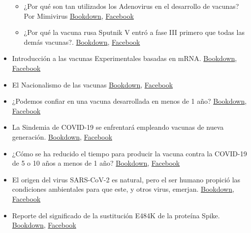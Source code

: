 \documentclass[
  12pt, krantz2,
  spanish,
]{krantz}
\begin{document}
\begin{itemize}
  \begin{itemize}
  \item
    ¿Por qué son tan utilizados los Adenovirus en el desarrollo de vacunas? Por Mimivirus \href{}{Bookdown}, \href{https://www.facebook.com/permalink.php?story_fbid=194256785632477\&id=107088044349352}{Facebook}
  \item
    ¿Por qué la vacuna rusa Sputnik V entró a fase III primero que todas las demás vacunas?. \href{}{Bookdown}, \href{https://www.facebook.com/permalink.php?story_fbid=194473115610844\&id=107088044349352}{Facebook}
  \end{itemize}
\item
  Introducción a las vacunas Experimentales basadas en mRNA. \href{}{Bookdown}, \href{https://www.facebook.com/permalink.php?story_fbid=195407762184046\&id=107088044349352}{Facebook}
\item
  El Nacionalismo de las vacunas \href{}{Bookdown}, \href{https://www.facebook.com/permalink.php?story_fbid=195747918816697\&id=107088044349352}{Facebook}
\item
  ¿Podemos confiar en una vacuna desarrollada en menos de 1 año? \href{}{Bookdown}, \href{https://www.facebook.com/permalink.php?story_fbid=210814357310053\&id=107088044349352}{Facebook}
\item
  La Sindemia de COVID-19 se enfrentará empleando vacunas de nueva generación. \href{}{Bookdown}, \href{https://www.facebook.com/permalink.php?story_fbid=211176330607189\&id=107088044349352}{Facebook}
\item
  ¿Cómo se ha reducido el tiempo para producir la vacuna contra la COVID-19 de 5 o 10 años a menos de 1 año? \href{}{Bookdown}, \href{https://www.facebook.com/BioViral/videos/437319657293716/}{Facebook}
\item
  El origen del virus SARS-CoV-2 es natural, pero el ser humano propició las condiciones ambientales para que este, y otros virus, emerjan. \href{}{Bookdown}, \href{https://www.facebook.com/permalink.php?story_fbid=215833596808129\&id=107088044349352}{Facebook}
\item
  Reporte del significado de la sustitución E484K de la proteína Spike. \href{}{Bookdown}, \href{https://www.facebook.com/permalink.php?story_fbid=238010707923751\&id=107088044349352}{Facebook}


\end{itemize}
\end{document}
